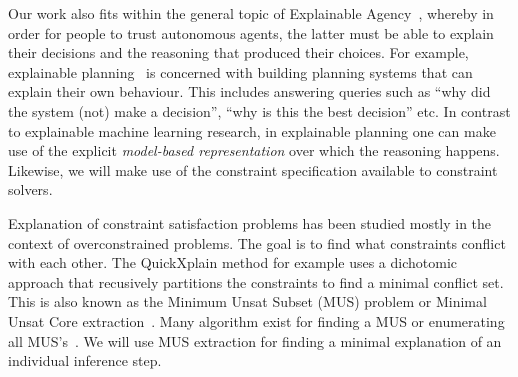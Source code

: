Our work also fits within the general topic of Explainable Agency~\cite{langley2017explainable}, whereby in order for people to trust autonomous agents, the latter must be able to explain their decisions and the reasoning that produced their choices. 
For example, explainable planning~\cite{fox2017explainable} is concerned with building planning systems that can explain their own behaviour. This includes answering queries such as ``why did the system (not) make a decision'', ``why is this the best decision'' etc. In contrast to explainable machine learning research, in explainable planning one can make use of the explicit \textit{model-based representation} over which the reasoning happens. Likewise, we will make use of the constraint specification available to constraint solvers. %

Explanation of constraint satisfaction problems has been studied mostly in the context of overconstrained problems. The goal is to find what constraints conflict with each other. The QuickXplain method \cite{junker2001quickxplain} for example uses a dichotomic approach that recusively partitions the constraints to find a minimal conflict set. This is also known as the Minimum Unsat Subset (MUS) problem or Minimal Unsat Core extraction~\cite{marques2010minimal}. Many algorithm exist for finding a MUS or enumerating all MUS's~\cite{marques2010minimal}. We will use MUS extraction for finding a minimal explanation of an individual inference step.

